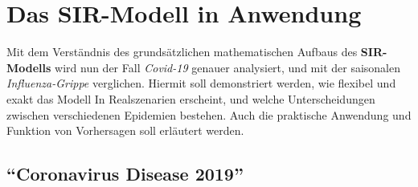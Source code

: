 \documentclass[12pt]{scrartcl} %
\begin{document}








\section{Das SIR-Modell in Anwendung}

Mit dem Verständnis des grundsätzlichen mathematischen Aufbaus des \textbf{SIR-Modells} wird nun der Fall \textsl{Covid-19} genauer analysiert, und mit der saisonalen \textsl{Influenza-Grippe} verglichen. Hiermit soll demonstriert werden, wie flexibel und exakt das Modell In Realszenarien erscheint, und welche Unterscheidungen zwischen verschiedenen Epidemien bestehen. Auch die praktische Anwendung und Funktion von Vorhersagen soll erläutert werden.


\subsection{"`Coronavirus Disease 2019"'}
\end{document}
